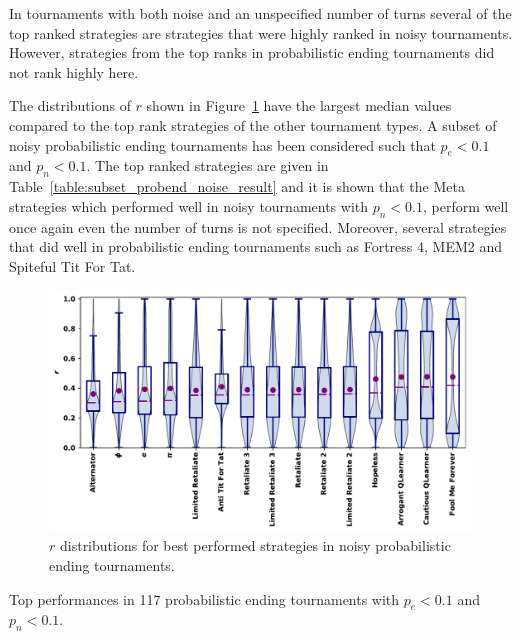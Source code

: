 \documentclass{article}
\begin{document}
In tournaments with both noise and an unspecified number of turns several of the
top ranked strategies are strategies that were highly ranked in noisy
tournaments. However, strategies from the top ranks in probabilistic ending
tournaments did not rank highly here.

The distributions of \(r\) shown in Figure~\ref{fig:noisy_probend_results} have
the largest median values compared to the top rank strategies of the other
tournament types. A subset of noisy probabilistic ending tournaments has been
considered such that \(p_e < 0.1\) and \(p_n < 0.1\). The top ranked strategies
are given in Table~\ref{table:subset_probend_noise_result} and it is shown that
the Meta strategies which performed well in noisy tournaments with \(p_n <
0.1\), perform well once again even the number of turns is not specified.
Moreover, several strategies that did well in probabilistic ending tournaments
such as Fortress 4, MEM2 and Spiteful Tit For Tat.

\begin{figure}[!htbp]
    \centering
    \includegraphics[width=.7\textwidth]{../images/performance_probend_noise.pdf}
    \caption{\(r\) distributions for best performed strategies in noisy
    probabilistic ending tournaments.}
    \label{fig:noisy_probend_results}
\end{figure}

\begin{table}[!htbp]
    \centering
    \resizebox{.27\textwidth}{!}{
    }
    \caption{Top performances in 117 probabilistic ending tournaments with \(p_e < 0.1\) and \(p_n < 0.1\).}
    \label{table:subset_probend_noise_result}
\end{table}
\end{document}
